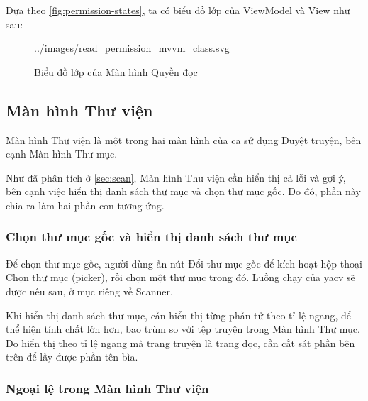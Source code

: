 \documentclass[../../../../thesis]{subfiles}
\begin{document}
Dựa theo \autoref{fig:permission-states}, ta có biểu đồ lớp của ViewModel và
View như sau:

\begin{figure}[H]
    \centering
    
        {../images/read_permission_mvvm_class.svg}
    \caption{Biểu đồ lớp của Màn hình Quyền đọc}
    \label{fig:read_permission_mvvm_class}
\end{figure}



\subsection{Màn hình Thư viện}\label{sec:library-design}

Màn hình Thư viện là một trong hai màn hình của \hyperref[sec:browsing]{ca sử
dụng Duyệt truyện}, bên cạnh Màn hình Thư mục.

Như đã phân tích ở \autoref{sec:scan}, Màn hình Thư viện cần hiển thị cả lỗi và
gợi ý, bên cạnh việc hiển thị danh sách thư mục và chọn thư mục gốc. Do đó, phần
này chia ra làm hai phần con tương ứng.

\subsubsection{Chọn thư mục gốc và hiển thị danh sách thư mục}

Để chọn thư mục gốc, người dùng ấn nút Đổi thư mục gốc để kích hoạt hộp thoại
Chọn thư mục (picker), rồi chọn một thư mục trong đó. Luồng chạy của yacv sẽ
được nêu sau, ở mục riêng về Scanner.

Khi hiển thị danh sách thư mục, cần hiển thị từng phần tử theo tỉ lệ ngang, để
thể hiện tính chất lớn hơn, bao trùm so với tệp truyện trong Màn hình Thư mục.
Do hiển thị theo tỉ lệ ngang mà trang truyện là trang dọc, cần cắt sát phần bên
trên để lấy được phần tên bìa.

%     

\subsubsection{Ngoại lệ trong Màn hình Thư viện}
\end{document}
